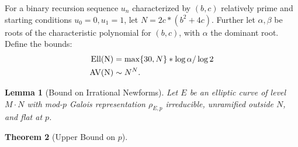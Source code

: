 \documentclass[12pt]{amsart}
\newtheorem{thm}{Theorem}[section]
\newtheorem{lem}[thm]{Lemma}
\theoremstyle{definition}
\newcommand{\Ell}{\rm Ell}
\newcommand{\AV}{\rm AV}
\begin{document}
For a binary recursion sequence $u_n$ characterized by $(b,c)$ relatively prime and starting conditions $u_0=0,u_1=1$, let $N = 2c * (b^2+4c)$.  Further let $\alpha,\beta$ be roots of the characteristic polynomial for $(b,c)$, with $\alpha$ the dominant root.  Define the bounds:
\begin{align*}
\Ell(N) & = \max\{30, N\}*\log{\alpha}/\log{2} \\
\AV(N) & \sim N^N. 
\end{align*}

\begin{lem}[Bound on Irrational Newforms]\label{irnewbound1}
Let $E$ be an elliptic curve of level $M \cdot N$ with mod-$p$ Galois representation $\rho_{E,p}$ irreducible, unramified outside $N$, and flat at $p$.
\end{lem}


\begin{thm}[Upper Bound on $p$]

\end{thm}
\end{document}
